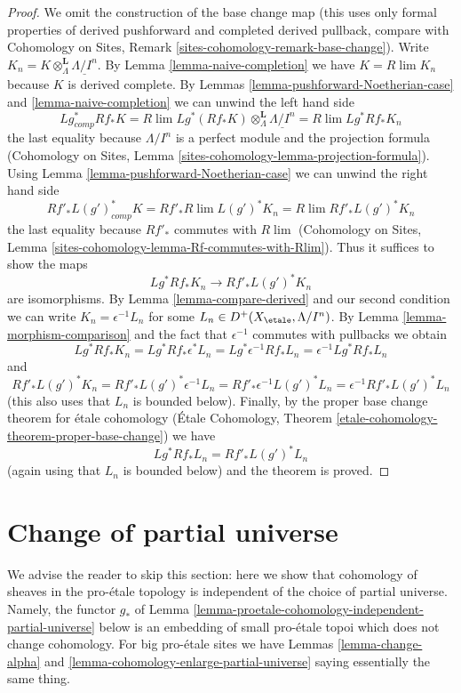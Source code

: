 \begin{proof}
We omit the construction of the base change map (this uses only
formal properties of derived pushforward and completed derived pullback,
compare with
Cohomology on Sites, Remark \ref{sites-cohomology-remark-base-change}).
Write $K_n = K \otimes^\mathbf{L}_\Lambda \underline{\Lambda/I^n}$.
By Lemma \ref{lemma-naive-completion} we have $K = R\lim K_n$
because $K$ is derived complete.
By Lemmas \ref{lemma-pushforward-Noetherian-case} and
\ref{lemma-naive-completion} we can unwind the left hand side
$$
Lg_{comp}^* Rf_* K =
R\lim Lg^*(Rf_*K)\otimes^\mathbf{L}_\Lambda \underline{\Lambda/I^n} =
R\lim Lg^* Rf_* K_n
$$
the last equality because $\Lambda/I^n$ is a perfect module and
the projection formula (Cohomology on Sites, Lemma
\ref{sites-cohomology-lemma-projection-formula}).
Using Lemma \ref{lemma-pushforward-Noetherian-case} we can unwind the right
hand side
$$
Rf'_* L(g')^*_{comp} K =
Rf'_* R\lim L(g')^* K_n  =
R\lim Rf'_* L(g')^* K_n
$$
the last equality because $Rf'_*$ commutes with $R\lim$
(Cohomology on Sites, Lemma
\ref{sites-cohomology-lemma-Rf-commutes-with-Rlim}).
Thus it suffices to show the maps
$$
Lg^* Rf_* K_n \longrightarrow Rf'_* L(g')^* K_n
$$
are isomorphisms. By Lemma \ref{lemma-compare-derived} and our second
condition we can write $K_n = \epsilon^{-1}L_n$ for some
$L_n \in D^+(X_\etale, \Lambda/I^n)$. By Lemma \ref{lemma-morphism-comparison}
and the fact that $\epsilon^{-1}$ commutes with pullbacks
we obtain
$$
Lg^* Rf_* K_n =
Lg^* Rf_* \epsilon^*L_n =
Lg^* \epsilon^{-1} Rf_* L_n =
\epsilon^{-1} Lg^* Rf_* L_n
$$
and
$$
Rf'_* L(g')^* K_n =
Rf'_* L(g')^* \epsilon^{-1} L_n =
Rf'_* \epsilon^{-1} L(g')^* L_n =
\epsilon^{-1} Rf'_* L(g')^* L_n
$$
(this also uses that $L_n$ is bounded below).
Finally, by the proper base change theorem for \'etale cohomology
(\'Etale Cohomology, Theorem
\ref{etale-cohomology-theorem-proper-base-change}) we have
$$
Lg^* Rf_* L_n = Rf'_* L(g')^* L_n
$$
(again using that $L_n$ is bounded below)
and the theorem is proved.
\end{proof}






\section{Change of partial universe}
\label{section-change-universe}

\noindent
We advise the reader to skip this section: here we show that cohomology
of sheaves in the pro-\'etale topology is independent of the
choice of partial universe. Namely, the functor $g_*$ of
Lemma \ref{lemma-proetale-cohomology-independent-partial-universe} below
is an embedding of small pro-\'etale topoi which does not change cohomology.
For big pro-\'etale sites we have Lemmas \ref{lemma-change-alpha} and
\ref{lemma-cohomology-enlarge-partial-universe} saying essentially the
same thing.

